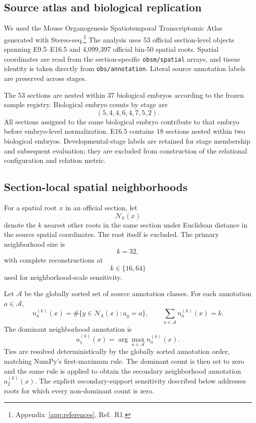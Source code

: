\documentclass[11pt]{article}
\begin{document}
\subsection{Source atlas and biological replication}

We used the Mouse Organogenesis Spatiotemporal Transcriptomic Atlas generated with Stereo-seq.\footnote{Appendix~\ref{app:references}, Ref.~R1.} The analysis uses 53 official section-level objects spanning E9.5--E16.5 and 4,099,397 official bin-50 spatial roots. Spatial coordinates are read from the section-specific \texttt{obsm/spatial} arrays, and tissue identity is taken directly from \texttt{obs/annotation}. Literal source annotation labels are preserved across stages.

The 53 sections are nested within 37 biological embryos according to the frozen sample registry. Biological embryo counts by stage are
\[
(5,4,4,6,4,7,5,2).
\]
All sections assigned to the same biological embryo contribute to that embryo before embryo-level normalization. E16.5 contains 18 sections nested within two biological embryos. Developmental-stage labels are retained for stage membership and subsequent evaluation; they are excluded from construction of the relational configuration and relation metric.

\subsection{Section-local spatial neighborhoods}

For a spatial root \(x\) in an official section, let
\[
\mathcal N_k(x)
\]
denote the \(k\) nearest other roots in the same section under Euclidean distance in the source spatial coordinates. The root itself is excluded. The primary neighborhood size is
\[
k=32,
\]
with complete reconstructions at
\[
k\in\{16,64\}
\]
used for neighborhood-scale sensitivity.

Let \(\mathcal A\) be the globally sorted set of source annotation classes. For each annotation \(a\in\mathcal A\),
\[
n_a^{(k)}(x)
=
\#\{y\in\mathcal N_k(x):a_y=a\},
\qquad
\sum_{a\in\mathcal A}n_a^{(k)}(x)=k.
\]
The dominant neighborhood annotation is
\[
a_1^{(k)}(x)
=
\arg\max_{a\in\mathcal A}n_a^{(k)}(x).
\]
Ties are resolved deterministically by the globally sorted annotation order, matching NumPy's first-maximum rule. The dominant count is then set to zero and the same rule is applied to obtain the secondary neighborhood annotation \(a_2^{(k)}(x)\). The explicit secondary-support sensitivity described below addresses roots for which every non-dominant count is zero.
\end{document}
